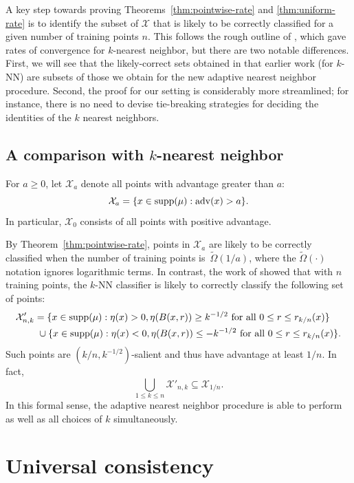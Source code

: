 \documentclass{article}
\def\X{{\mathcal X}}
\def\supp{{\rm supp}}
\def\adv{{\rm adv}}
\begin{document}
A key step towards proving Theorems~\ref{thm:pointwise-rate} and \ref{thm:uniform-rate} is to identify the subset of $\X$ that is likely to be correctly classified for a given number of training points $n$. This follows the rough outline of \cite{ChaudhuriDasgupta2014}, which gave rates of convergence for $k$-nearest neighbor, but there are two notable differences. First, we will see that the likely-correct sets obtained in that earlier work (for $k$-NN) are subsets of those we obtain for the new adaptive nearest neighbor procedure. Second, the proof for our setting is considerably more streamlined; for instance, there is no need to devise tie-breaking strategies for deciding the identities of the $k$ nearest neighbors.



\subsection{A comparison with $k$-nearest neighbor}
\label{sec:knn-comparison}

For $a \geq 0$, let $\X_a$ denote all points with advantage greater than $a$:
\begin{equation}
\X_a = \{x \in \supp(\mu): \adv(x) > a \} .
\label{eq:advantage-set}
\end{equation}
In particular, $\X_0$ consists of all points with positive advantage. 

By Theorem~\ref{thm:pointwise-rate}, points in $\X_a$ are likely to be correctly classified when the number of training points is~$\widetilde{\Omega}(1/a)$, where the $\widetilde{\Omega}(\cdot)$ notation ignores logarithmic terms.
In contrast, the work of \cite{ChaudhuriDasgupta2014} showed that with $n$ training points, the $k$-NN classifier is likely to correctly classify the following set of points:
\begin{align*}
\X'_{n,k} &= \{x \in \supp(\mu): \eta(x) > 0, \eta(B(x,r)) \geq k^{-1/2} \mbox{\ for all $0 \leq r \leq r_{k/n}(x)$}\} \\
&\ \cup \{x \in \supp(\mu): \eta(x) < 0, \eta(B(x,r)) \leq -k^{-1/2} \mbox{\ for all $0 \leq r \leq r_{k/n}(x)$}\} .
\end{align*}
Such points are $(k/n, k^{-1/2})$-salient and thus have advantage at least $1/n$. In fact,
$$ \bigcup_{1 \leq k \leq n} \X'_{n,k} \subseteq \X_{1/n} .$$
In this formal sense, the adaptive nearest neighbor procedure is able to perform as well as all choices of $k$ simultaneously.

\section{Universal consistency}\label{sec:gen2}
\label{sec:universal-consistency}
\end{document}
